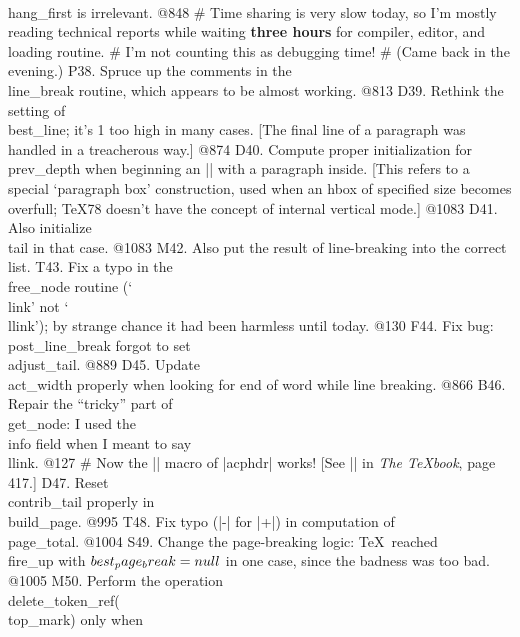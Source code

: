	\\{hang_first} is irrelevant. @848
# Time sharing is very slow today, so I'm mostly reading technical reports while
	waiting\/ {\bf three hours} for compiler, editor, and loading routine.
# I'm not counting this as debugging time!
# (Came back in the evening.)
P38. Spruce up the comments in the \\{line_break} routine, which appears to be
	almost working. @813
D39. Rethink the setting of \\{best_line}; it's 1 too high in many cases.
	[The final line of a paragraph was handled in a treacherous way.] @874
D40. Compute proper initialization for
	\\{prev_depth} when beginning an |\hbox|
	with a paragraph inside. [This refers to a special `paragraph box'
	construction, used when an hbox of specified size becomes overfull;
	\TeX78 doesn't have the concept of internal vertical mode.] @1083
D41. Also initialize \\{tail} in that case. @1083
M42. Also put the result of line-breaking into the correct list.
T43. Fix a typo in the \\{free_node} routine (`\\{link}' not `\\{llink}');
	by strange chance it had been harmless until today. @130
F44. Fix bug: \\{post_line_break} forgot to set \\{adjust_tail}. @889
D45. Update \\{act_width} properly when looking for end of word while
	line breaking. @866
B46. Repair the ``tricky'' part of \\{get_node}: I used the \\{info} field
	when I meant to say \\{llink}. @127
# Now the |\corners| macro of |acphdr| works! [See |\setcornerrules|
	in {\sl The \TeX book}, page 417.]
D47. Reset \\{contrib_tail} properly in \\{build_page}. @995
T48. Fix typo (|-| for |+|) in computation of \\{page_total}. @1004
S49. Change the page-breaking logic: \TeX\ reached \\{fire_up} with
	$\\{best_page_break}=\\{null}$ in one case,
	since the badness was too bad. @1005
M50. Perform the operation \\{delete_token_ref}(\\{top_mark}) only when
